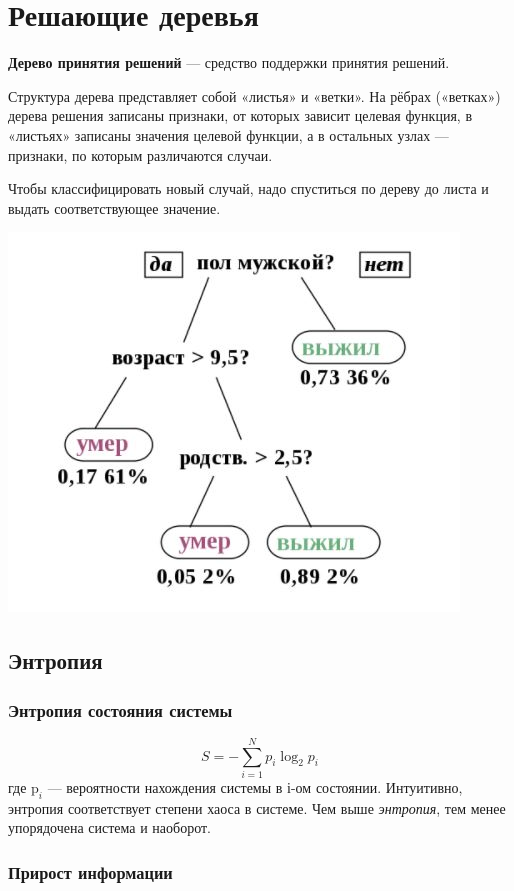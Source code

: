 \section{Решающие деревья}

\textbf{Дерево принятия решений}  — средство поддержки принятия решений.

Структура дерева представляет собой «листья» и «ветки». На рёбрах («ветках») дерева решения записаны признаки, от которых зависит целевая функция, в «листьях» записаны значения целевой функции, а в остальных узлах — признаки, по которым различаются случаи.

Чтобы классифицировать новый случай, надо спуститься по дереву до листа и выдать соответствующее значение.

\includegraphics[]{tickets/pictures/1.JPG}

\subsection{Энтропия}


\subsubsection{Энтропия состояния системы}
$$
S=-\sum_{i=1}^{N} p_{i} \log _{2} p_{i}
$$
где $\mathrm{p}_{i} $ --- вероятности нахождения системы в і-ом состоянии.
Интуитивно, энтропия соответствует степени хаоса в системе.
Чем выше \textit{энтропия}, тем менее упорядочена система и наоборот.

\subsubsection{Прирост информации}

